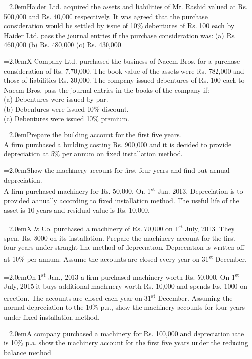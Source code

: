 \documentclass[11pt,a4paper]{article}
\newcommand{\lqn}[2]{\Needspace{6\baselineskip}\par\medskip\noindent\hangindent=2.0em\hangafter=1\makebox[2.0em][l]{\textbf{#1.}}#2\par}
\begin{document}
\lqn{60}{Haider Ltd. acquired the assets and liabilities of Mr. Rashid valued at Rs. 500,000 and Rs. 40,000 respectively. It was agreed that the purchase consideration would be settled by issue of 10\% debentures of Rs. 100 each by Haider Ltd. pass the journal entries if the purchase consideration was:  (a)  Rs. 460,000      (b)  Rs. 480,000      (c)  Rs. 430,000\par
}
\lqn{61}{X Company Ltd. purchased the business of Naeem Bros. for a purchase consideration of Rs. 7,70,000. The book value of the assets were Rs. 782,000 and those of liabilities Rs. 30,000. The company issued debentures of Rs. 100 each to Naeem Bros. pass the journal entries in the books of the company if:\\
(a)  Debentures were issued by par.\\
(b)  Debentures were issued 10\% discount.\\
(c)  Debentures were issued 10\% premium.\par
}
\lqn{62}{Prepare the building account for the first five years.\\
A firm purchased a building costing Rs. 900,000 and it is decided to provide depreciation at 5\% per annum on fixed installation method.\par
}
\lqn{63}{Show the machinery account for first four years and find out annual depreciation.\\
A firm purchased machinery for Rs. 50,000. On 1\textsuperscript{st}  Jan. 2013. Depreciation is to provided annually according to fixed installation method. The useful life of the asset is 10 years and residual value is Rs. 10,000.\par
}
\lqn{64}{X \& Co. purchased a machinery of Rs. 70,000 on 1\textsuperscript{st}  July, 2013. They spent Rs. 8000 on its installation. Prepare the machinery account for the first four years under straight line method of depreciation. Depreciation is written off at 10\% per annum. Assume the accounts are closed every year on 31\textsuperscript{st}  December.\par
}
\lqn{65}{On 1\textsuperscript{st}  Jan., 2013 a firm purchased machinery worth Rs. 50,000. On 1\textsuperscript{st}  July, 2015 it buys additional machinery worth Rs. 10,000 and spends Rs. 1000 on erection. The accounts are closed each year on 31\textsuperscript{st}  December. Assuming the normal depreciation to the 10\% p.a., show the machinery accounts for four years under fixed installation method.\par
}
\lqn{66}{A company purchased a machinery for Rs. 100,000 and depreciation rate is 10\% p.a. show the machinery account for the first five years under the reducing balance method\par
}
\end{document}
